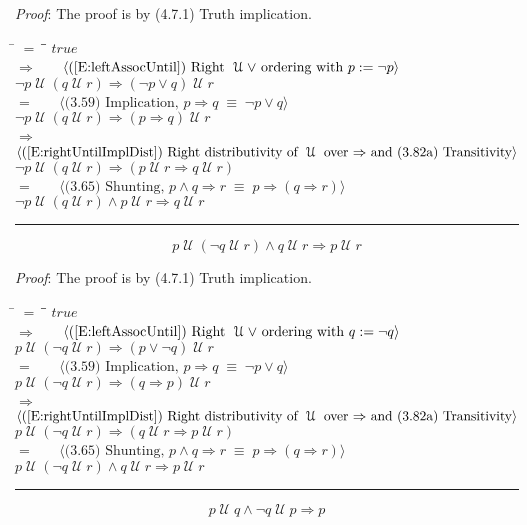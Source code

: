 \documentclass[12pt, fleqn, leqno]{article}
\newcommand{\lgap}{2pt}                             %
\newcommand{\mymathindent}{24pt}                    %
\newcommand{\equivs}{\ensuremath{\;\equiv\;}}       %
\newcommand{\impl}{\ensuremath{\Rightarrow}}        %
\newcommand{\Until}{\;\mathcal{U}\;}
\newcommand{\myqed}{\rule[-.23ex]{1.2ex}{2.0ex}}
\newcommand{\myqedtab}{\hspace{384pt}}              %
\newcommand{\Gll} {\langle}                         %
\newcommand{\Ggg} {\rangle}                         %
\newcommand{\Hint}[1]     {\ \ \ $\Gll              \mbox{#1} \Ggg$ }   %
\begin{document}
\emph{Proof}: The proof is by (4.7.1) Truth implication.
\begin{tabbing}
\hspace{\mymathindent} \= $= \;$ \= \myqedtab \= \kill
  \> \> $true$\\[\lgap]
  \> $\impl$ \> \Hint{(\ref{E:leftAssocUntil})  Right $\Until \lor$ ordering with $p:=\neg p$} \\[\lgap]
  \> \> $\neg p\Until(q\Until r) \impl (\neg p\lor q)\Until r$\\[\lgap]
  \> $=$  \>  \Hint{(3.59) Implication, $p\impl q \equivs \neg p \lor q$}\\[\lgap]
  \> \> $\neg p\Until(q\Until r) \impl (p \impl q)\Until r$\\[\lgap]
  \> $\impl$  \>  \Hint{(\ref{E:rightUntilImplDist}) Right distributivity of $\Until$ over $\impl$ and (3.82a) Transitivity}\\[\lgap]
  \> \> $\neg p\Until(q\Until r) \impl (p \Until r \impl q \Until r)$\\[\lgap]
  \> $=$  \>  \Hint{(3.65) Shunting, $p\land q\impl r\equivs p\impl (q\impl r)$}\\[\lgap]
  \> \> $\neg p \Until (q \Until r) \land p\Until r \impl q\Until r$ \quad \myqed
\end{tabbing}
\begin{equation}\label{E:PUntilNotQUntilR}
p \Until (\neg q \Until r) \land q\Until r \impl p\Until r
\end{equation}

\emph{Proof}: The proof is by (4.7.1) Truth implication.
\begin{tabbing}
\hspace{\mymathindent} \= $= \;$ \= \myqedtab \= \kill
  \> \> $true$\\[\lgap]
  \> $\impl$ \> \Hint{(\ref{E:leftAssocUntil})  Right $\Until \lor$ ordering with $q:=\neg q$} \\[\lgap]
  \> \> $p\Until(\neg q\Until r) \impl (p\lor \neg q)\Until r$\\[\lgap]
  \> $=$  \>  \Hint{(3.59) Implication, $p\impl q \equivs \neg p \lor q$}\\[\lgap]
  \> \> $p\Until(\neg q\Until r) \impl (q \impl p)\Until r$\\[\lgap]
  \> $\impl$  \>  \Hint{(\ref{E:rightUntilImplDist}) Right distributivity of $\Until$ over $\impl$ and (3.82a) Transitivity}\\[\lgap]
  \> \> $p\Until(\neg q\Until r) \impl (q \Until r \impl p \Until r)$\\[\lgap]
  \> $=$  \>  \Hint{(3.65) Shunting, $p\land q\impl r\equivs p\impl (q\impl r)$}\\[\lgap]
  \> \> $p \Until (\neg q \Until r) \land q\Until r \impl p\Until r$ \quad \myqed
\end{tabbing}
\begin{equation}\label{E:pUntilQAndNotQUntilP}
p \Until q \land \neg q \Until p \impl p
\end{equation}
\end{document}
